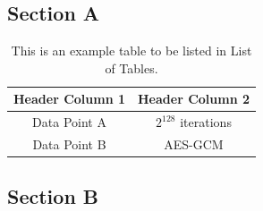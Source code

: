 \chapter{\approach}
\label{ch:approach}

\section{Section A}
\label{sec:approach:section-a}

\begin{table}[h]
    \caption{This is an example table to be listed in List of Tables.}
    \label{tab:example}
    \centering
    \begin{tabular}{cc}
        \toprule
        Header Column 1 & Header Column 2 \\ 
        \midrule
        Data Point A    & $2^{128}$ iterations \\ 
        Data Point B    & AES-GCM \\ 
        \bottomrule
    \end{tabular} 
\end{table}

\section{Section B}
\label{sec:approach:section-b}


